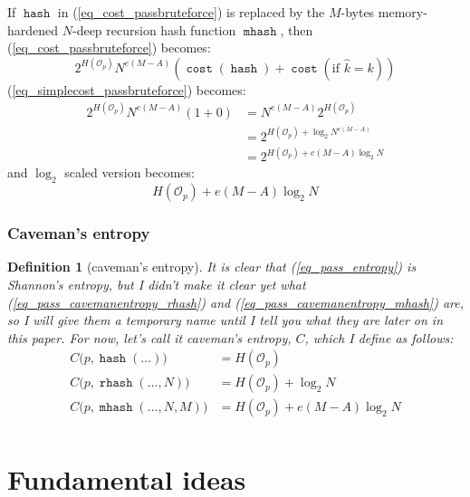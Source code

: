 \documentclass[twocolumn]{article}
\newtheorem{definition}{Definition}[section]
\DeclareMathOperator{\hash}{\mathtt{hash}}
\DeclareMathOperator{\rhash}{\mathtt{rhash}}
\DeclareMathOperator{\mhash}{\mathtt{mhash}}
\DeclareMathOperator{\cost}{\mathtt{cost}}
\begin{document}
If $\hash$ in (\ref{eq_cost_passbruteforce}) is replaced by the $M$-bytes
memory-hardened $N$-deep recursion hash function $\mhash$, then
(\ref{eq_cost_passbruteforce}) becomes:
\begin{equation}\label{eq_cost_passbruteforce_NM}
    2^{H(\mathcal{O}_p)} N^{e(M-A)} \left(
        \cost(\hash) + \cost(\text{if } \hat k = k)
    \right)
\end{equation}
(\ref{eq_simplecost_passbruteforce}) becomes:
\begin{equation}\label{eq_simplecost_passbruteforce_NM}
    \begin{split}
    2^{H(\mathcal{O}_p)} N^{e(M-A)} (1+0) 
                  &= N^{e(M-A)} 2^{H(\mathcal{O}_p)}\\
                  &= 2^{H(\mathcal{O}_p) + \log_2 N^{e(M-A)}} \\
                  &= 2^{H(\mathcal{O}_p) + e(M-A)\log_2 N}
    \end{split}
\end{equation}
and $\log_2$ scaled version becomes:
\begin{equation}\label{eq_pass_cavemanentropy_mhash}
    H(\mathcal{O}_p) + e(M-A)\log_2 N
\end{equation}

\subsubsection{Caveman's entropy}
\begin{definition}[caveman's entropy]\label{def_cavemanentropy}
It is clear that (\ref{eq_pass_entropy}) is Shannon's entropy, but I didn't
make it clear yet what (\ref{eq_pass_cavemanentropy_rhash}) and
(\ref{eq_pass_cavemanentropy_mhash}) are, so I will give them a temporary
name until I tell you what they are later on in this paper.  For now, let's
call it \emph{caveman's entropy}, $C$, which I define as follows:
\[
\begin{split}
C\Big(p, \hash(\ldots)\Big) &= H(\mathcal{O}_p) \\
C\Big(p, \rhash(\ldots, N)\Big) &= H(\mathcal{O}_p) + \log_2 N \\
C\Big(p, \mhash(\ldots, N, M)\Big) &= H(\mathcal{O}_p) + e(M-A)\log_2 N \\
\end{split}
\]
\end{definition}

\section{Fundamental ideas}\label{sec_fundamental_ideas}
\end{document}

